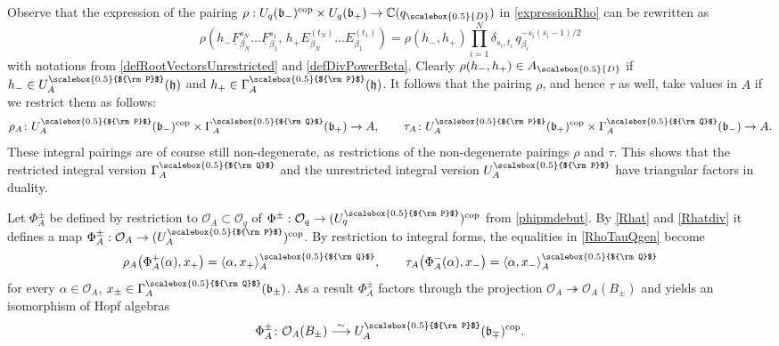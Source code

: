 \documentclass[11pt]{amsart}
\newcommand{\Oo}{\mathcal{O}}
\newcommand{\qD}{q_{\scalebox{0.5}{D}}}
\newcommand{\AD}{A_{\scalebox{0.5}{D}}}
\newcommand{\Q}{{\scalebox{0.5}{${\rm Q}$}}}
\newcommand{\Pup}{{\scalebox{0.5}{${\rm P}$}}}
\begin{document}
Observe that the expression of the pairing $\rho : U_q(\mathfrak{b}_-)^{\mathrm{cop}} \times U_q(\mathfrak{b}_+) \to \mathbb{C}(\qD)$ in \eqref{expressionRho} can be rewritten as
\[ \rho\left( h_- \underline{F}_{\beta_N}^{s_N} \ldots \underline{F}_{\beta_1}^{s_1}, \,h_+ E_{\beta_N}^{(t_N)} \ldots E_{\beta_1}^{(t_1)} \right) = \rho(h_-,h_+)\prod_{i=1}^N \delta_{s_i,t_i} \, q_{\beta_i}^{-s_i(s_i - 1)/2} \]
with notations from \eqref{defRootVectorsUnrestricted} and \eqref{defDivPowerBeta}. Clearly $\rho(h_-,h_+) \in \AD$ if $h_- \in U_A^\Pup(\mathfrak{h})$ and $h_+ \in \Gamma_A^\Pup(\mathfrak{h})$. It follows that the pairing $\rho$, and hence $\tau$ as well, take values in $A$ if we restrict them as follows:
\begin{equation}\label{tauA}
\rho_A\colon U_A^\Pup(\mathfrak{b}_-)^{\rm cop}\times \Gamma_A^\Q(\mathfrak{b}_+)\to A, \qquad \tau_A\colon U_A^\Pup(\mathfrak{b}_+)^{\rm cop}\times \Gamma_A^\Q(\mathfrak{b}_-)\to A.
\end{equation}
These integral pairings are of course still non-degenerate, as restrictions of the non-degenerate pairings $\rho$ and $\tau$. This shows that the restricted integral version $\Gamma_A^\Q$ and the unrestricted integral version $U_A^\Pup$ have triangular factors in duality.

Let $\Phi_A^{\pm}$ be defined by restriction to $\Oo_A \subset \mathcal{O}_q$ of $\Phi^{\pm} : \mathcal{O}_q \to (U_q^\Pup)^{\mathrm{cop}}$ from \eqref{phipmdebut}. By \eqref{Rhat} and \eqref{Rhatdiv} it defines a map $\Phi_A^{\pm} : \mathcal{O}_A \to (U_A^\Pup)^{\mathrm{cop}}$. By restriction to integral forms, the equalities in \eqref{RhoTauQgen} become
\begin{equation}\label{identPhibracket}
\rho_A\bigl(\Phi_A^+(\alpha),x_+\bigr) = \langle \alpha,x_+\rangle_A^\Q,\qquad \tau_A\bigl(\Phi_A^-(\alpha),x_-\bigr) = \langle \alpha,x_-\rangle_A^\Q
\end{equation}
for every $\alpha\in \Oo_A$, $x_\pm\in \Gamma_A^\Q(\mathfrak{b}_\pm)$. As a result $\Phi_A^{\pm}$ factors through the projection $\mathcal{O}_A \twoheadrightarrow \mathcal{O}_A(B_\pm)$ and yields an isomorphism of Hopf algebras
\begin{equation}\label{Phi+-A}
\Phi_A^\pm\colon \Oo_A(B_\pm) \overset{\sim}{\longrightarrow} U_A^\Pup(\mathfrak{b}_\mp)^{\rm cop}.
\end{equation}
\end{document}
